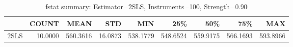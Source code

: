 \begin{table}[ht]
\centering
\caption{fstat summary: Estimator=2SLS, Instruments=100, Strength=0.90}
\begin{tabular}{lrrrrrrrr}
\toprule
 & COUNT & MEAN & STD & MIN & 25\% & 50\% & 75\% & MAX \\
\midrule
2SLS & 10.0000 & 560.3616 & 16.0873 & 538.1779 & 548.6524 & 559.9175 & 566.1693 & 593.8966 \\
\bottomrule
\end{tabular}
\end{table}
